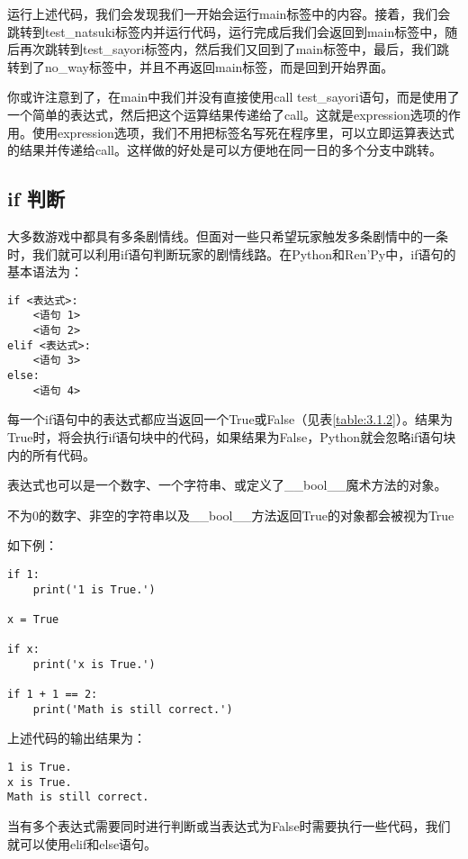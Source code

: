 运行上述代码，我们会发现我们一开始会运行main标签中的内容。接着，我们会跳转到test\_natsuki标签内并运行代码，运行完成后我们会返回到main标签中，随后再次跳转到test\_sayori标签内，然后我们又回到了main标签中，最后，我们跳转到了no\_way标签中，并且不再返回main标签，而是回到开始界面。

你或许注意到了，在main中我们并没有直接使用call test\_sayori语句，而是使用了一个简单的表达式，然后把这个运算结果传递给了call。这就是expression选项的作用。使用expression选项，我们不用把标签名写死在程序里，可以立即运算表达式的结果并传递给call。这样做的好处是可以方便地在同一日的多个分支中跳转。

\subsection{if 判断}
大多数游戏中都具有多条剧情线。但面对一些只希望玩家触发多条剧情中的一条时，我们就可以利用if语句判断玩家的剧情线路。在Python和Ren'Py中，if语句的基本语法为：
\begin{lstlisting}
if <表达式>:
    <语句 1>
    <语句 2>
elif <表达式>:
    <语句 3>
else:
    <语句 4>
\end{lstlisting}

每一个if语句中的表达式都应当返回一个True或False（见表\ref{table:3.1.2}）。结果为True时，将会执行if语句块中的代码，如果结果为False，Python就会忽略if语句块内的所有代码。

\begin{ExtraKnowledge}
    表达式也可以是一个数字、一个字符串、或定义了\_\_bool\_\_魔术方法的对象。

    不为0的数字、非空的字符串以及\_\_bool\_\_方法返回True的对象都会被视为True
\end{ExtraKnowledge}

如下例：

\begin{lstlisting}
if 1:
    print('1 is True.')

x = True

if x:
    print('x is True.')

if 1 + 1 == 2:
    print('Math is still correct.')
\end{lstlisting}

上述代码的输出结果为：
\begin{lstlisting}
1 is True.
x is True.
Math is still correct.
\end{lstlisting}

当有多个表达式需要同时进行判断或当表达式为False时需要执行一些代码，我们就可以使用elif和else语句。

